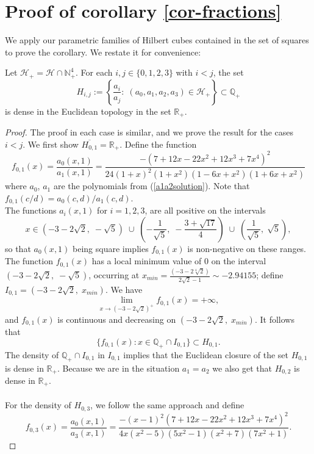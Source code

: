 \documentclass[10pt]{amsart}
\theoremstyle{plain}
\def\cal{\mathcal}
\def\bbb{\mathbb}
\newcommand{\R}{\bbb{R}}
\newcommand{\N}{\bbb{N}}
\newcommand{\Q}{\bbb{Q}}
\begin{document}
\bigskip

\section{Proof of corollary {\ref{cor-fractions}} }

We apply our parametric families of Hilbert cubes contained in the set of squares 
to prove the corollary. We restate it for convenience:

Let $\cal{H}_{+}=\cal{H}\cap \N_{+}^{4}$. For each $i, j\in\{0, 1, 2, 3\}$ with $i<j$, the set
$$
H_{i,j}:=\left\{\frac{a_{i}}{a_{j}}:\;(a_{0}, a_{1}, a_{2}, a_{3})\in\cal{H}_{+}\right\}\subset \Q_{+}
$$
is dense in the Euclidean topology in the set $\R_{+}$.

\begin{proof}
The proof in each case is similar, and we prove the result for the cases $i < j$.
We first show $\overline{H_{0,1}}=\R_{+}$. Define the function
\[ f_{0,1}(x) = \frac{a_0(x,1)}{a_1(x,1)} = \frac{ -(7+12x-22x^2+12x^3+7x^4)^2} {24(1 + x)^2(1 + x^2)(1-6x+x^2)(1+6x+x^2)} \]
where $a_0$, $a_1$ are the polynomials from (\ref{a1a2solution}). Note that $f_{0,1}(c/d) = a_0(c,d)/a_1(c,d)$. \\
The functions $a_i(x,1)$ for $i=1,2,3$, are all positive on the intervals
\[ x \in (-3-2\sqrt{2}, \; -\sqrt{5}) \; \cup \; \left(-\frac{1}{\sqrt{5}}, \; -\frac{3+\sqrt{17}}{4}\right) \; \cup \; \left(\frac{1}{\sqrt{5}}, \; \sqrt{5}\right), \]
so that $a_0(x,1)$ being square implies $f_{0,1}(x)$ is non-negative on these ranges.
The function $f_{0,1}(x)$ has a local minimum value of $0$ on the interval $(-3-2\sqrt{2}, \; -\sqrt{5})$, occurring at $x_{min} = \frac{(-3-2\sqrt[4]{2})}{2\sqrt{2}-1} \sim -2.94155$; define $I_{0,1} = (-3-2\sqrt{2}, \; x_{min})$.
We have
\[ \lim_{x \rightarrow (-3-2\sqrt{2})^{+}} f_{0,1}(x) = +\infty, \]
and $f_{0,1}(x)$ is continuous and decreasing on $(-3-2\sqrt{2}, \; x_{min})$.
It follows that
\[ \{ f_{0,1}(x) : x \in \Q_{+} \cap I_{0,1} \} \subset H_{0,1}. \]
The density of $\Q_{+} \cap I_{0,1}$ in $I_{0,1}$ implies that the Euclidean closure of the set $H_{0,1}$ is dense in $\R_{+}$.
Because we are in the situation $a_1=a_2$ we also get that $H_{0,2}$ is dense in $\R_{+}$. \\ \\
For the density of $H_{0,3}$, we follow the same approach and define
\[ f_{0,3}(x) = \frac{a_0(x,1)}{a_3(x,1)} = \frac{-(x-1)^2 (7+12x-22x^2+12x^3+7x^4)^2}{4x(x^2-5)(5x^2-1)(x^2+7)(7x^2+1)}. \]


\end{proof}
\end{document}
